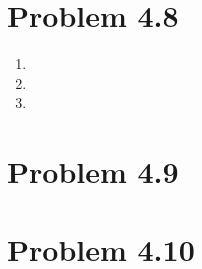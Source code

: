 \documentclass{article}
\begin{document}
\section*{Problem 4.8}
\begin{enumerate}[label=(\alph*)]
  \item 
  \item 
  \item 
\end{enumerate}

\section*{Problem 4.9}

\section*{Problem 4.10}
\end{document}
